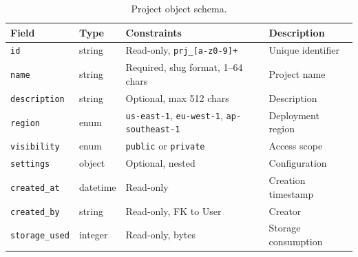 \documentclass[
    language=english,
    doctype=article,
    institution=none,
]{../../omnilatex}
\begin{document}
\begin{table}[htbp]
    \centering
    \caption{Project object schema.}
    \label{tab:project-schema}
    \begin{tabularx}{\textwidth}{@{}lllX@{}}
        \toprule
        \textbf{Field} & \textbf{Type} & \textbf{Constraints} & \textbf{Description} \\
        \midrule
        \texttt{id}               & string   & Read-only, \texttt{prj\_[a-z0-9]+} & Unique identifier \\
        \texttt{name}             & string   & Required, slug format, 1--64 chars & Project name \\
        \texttt{description}      & string   & Optional, max 512 chars & Description \\
        \texttt{region}           & enum     & \texttt{us-east-1}, \texttt{eu-west-1}, \texttt{ap-southeast-1} & Deployment region \\
        \texttt{visibility}       & enum     & \texttt{public} or \texttt{private} & Access scope \\
        \texttt{settings}         & object   & Optional, nested & Configuration \\
        \texttt{created\_at}      & datetime & Read-only & Creation timestamp \\
        \texttt{created\_by}      & string   & Read-only, FK to User & Creator \\
        \texttt{storage\_used}    & integer  & Read-only, bytes & Storage consumption \\
        \bottomrule
    \end{tabularx}
\end{table}
\end{document}

